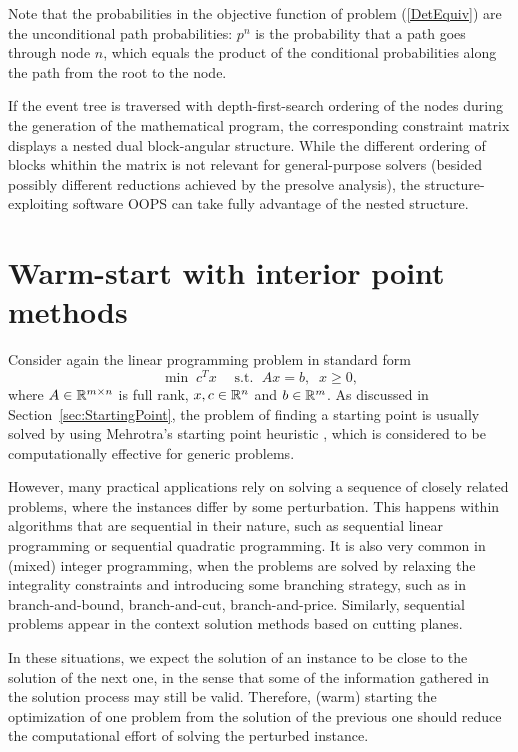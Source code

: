 Note that the probabilities in the objective function of problem 
(\ref{DetEquiv}) are the unconditional path probabilities: $p^n$ is 
the probability that a path goes through node $n$, which equals the 
product of the conditional probabilities along the path from the root 
to the node.

If the event tree is traversed with depth-first-search ordering of the 
nodes during the generation of the mathematical program, the 
corresponding constraint matrix displays a nested dual block-angular 
structure.
%
While the different ordering of blocks whithin the matrix is not 
relevant for general-purpose solvers (besided possibly different 
reductions achieved by the presolve analysis), the 
structure-exploiting software OOPS \cite{GondzioSarkissian} can take 
fully advantage of the nested structure.


%
%
\section{Warm-start with interior point methods}
\label{sec:WarmStart}

Consider again the linear programming problem in standard form
\[
\min\;  c^T x \;\quad \mbox{s.t. }\; Ax = b, \;\; x \ge 0,
\]
where $A \in \mathbb{R}^{m \times n}$ is full rank, 
$x, c \in \mathbb{R}^{n}$ and $b \in \mathbb{R}^{m}$. 
As discussed in Section~\ref{sec:StartingPoint}, the problem of 
finding a starting point is usually solved by using 
Mehrotra's starting point heuristic \cite{Mehrotra92}, which is 
considered to be computationally effective for generic problems.

However, many practical applications rely on solving a sequence 
of closely related problems, where the instances differ by some 
perturbation. This happens within algorithms that are sequential 
in their nature, such as sequential linear programming or
sequential quadratic programming.
It is also very common in (mixed) integer programming, when the
problems are solved by relaxing the integrality constraints and
introducing some branching strategy, such as in branch-and-bound,
branch-and-cut, branch-and-price.
Similarly, sequential problems appear in the context solution 
methods based on cutting planes.

In these situations, we expect the solution of an instance to be 
close to the solution of the next one, in the sense that some of
the information gathered in the solution process may still be valid. 
Therefore, (warm) starting the 
optimization of one problem from the solution of the previous one
should reduce the computational effort of solving the perturbed instance.

